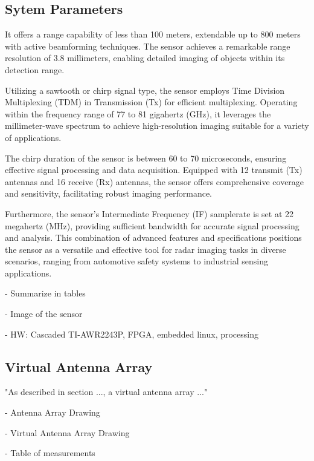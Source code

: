 \subsection{Sytem Parameters}
It offers a range capability of less than 100 meters, extendable up to 800 meters with active beamforming techniques.
The sensor achieves a remarkable range resolution of 3.8 millimeters, enabling detailed imaging of objects within its detection range.

Utilizing a sawtooth or chirp signal type, the sensor employs Time Division Multiplexing (TDM) in Transmission (Tx) for efficient multiplexing.
Operating within the frequency range of 77 to 81 gigahertz (GHz),
it leverages the millimeter-wave spectrum to achieve high-resolution imaging suitable for a variety of applications.

The chirp duration of the sensor is between 60 to 70 microseconds, ensuring effective signal processing and data acquisition.
Equipped with 12 transmit (Tx) antennas and 16 receive (Rx) antennas, the sensor offers comprehensive coverage and sensitivity,
facilitating robust imaging performance.

Furthermore, the sensor's Intermediate Frequency (IF) samplerate is set at 22 megahertz (MHz),
providing sufficient bandwidth for accurate signal processing and analysis.
This combination of advanced features and specifications positions the sensor as a versatile and effective tool for radar imaging tasks in diverse scenarios,
ranging from automotive safety systems to industrial sensing applications.

- Summarize in tables

- Image of the sensor

- HW: Cascaded TI-AWR2243P, FPGA, embedded linux, processing

\subsection{Virtual Antenna Array}

"As described in section ..., a virtual antenna array ..."

- Antenna Array Drawing

- Virtual Antenna Array Drawing

- Table of measurements



